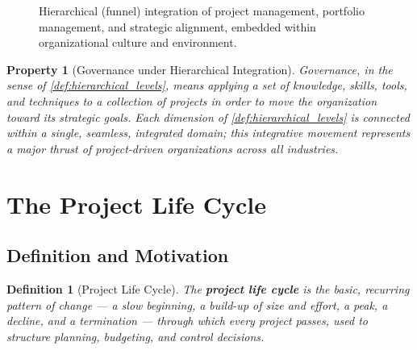 \documentclass[12pt, a4paper]{report}
\theoremstyle{engnotes}
\newtheorem{defn}{Definition}[section]
\newtheorem{property}{Property}[section]
\begin{document}
\begin{figure}[H]
    \centering
    \caption{Hierarchical (funnel) integration of project management, portfolio management, and strategic alignment, embedded within organizational culture and environment.}
    \label{fig:hierarchical_integration}
\end{figure}

\begin{property}[Governance under Hierarchical Integration]\label{pty:governance_hierarchical}
    Governance, in the sense of \cref{def:hierarchical_levels}, means applying a set of knowledge, skills, tools, and techniques to a collection of projects in order to move the organization toward its strategic goals. Each dimension of \cref{def:hierarchical_levels} is connected within a single, seamless, integrated domain; this integrative movement represents a major thrust of project-driven organizations across all industries.
\end{property}

\section{The Project Life Cycle}
\label{sec:project_life_cycle}

\subsection{Definition and Motivation}
\label{subsec:life_cycle_definition}

\begin{defn}[Project Life Cycle]\label{def:project_life_cycle}
    The \textbf{project life cycle} is the basic, recurring pattern of change --- a slow beginning, a build-up of size and effort, a peak, a decline, and a termination --- through which every project passes, used to structure planning, budgeting, and control decisions.
\end{defn}
\end{document}

